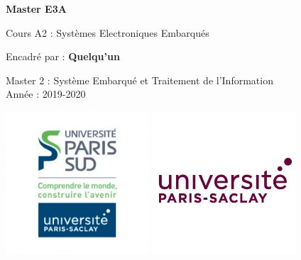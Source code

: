 \begin{titlepage}
\begin{center}
\vspace*{1cm}

\textbf{Master E3A}

\vspace{0.5cm}


Cours A2 : Systèmes Electroniques Embarqués

\vspace{1.5cm}
\mytitle

\vspace{1.5cm}
\theauthor

\vspace{1.5cm}
Encadré par :
\textbf{Quelqu'un}
\vfill

Master 2 : Système Embarqué et Traitement de l'Information\\
\vspace{0.8cm}
Année : 2019-2020
\vspace{0.8cm}
\begin{center}
	\includegraphics[width=0.4\textwidth]{logo}
	\includegraphics[width=0.4\textwidth]{logo2}
\end{center}


\end{center}
\end{titlepage}
